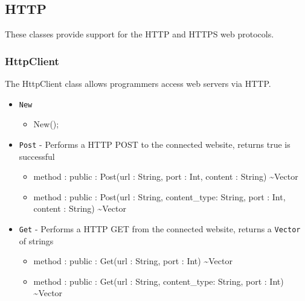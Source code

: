 \documentclass[11pt]{article}
\begin{document}
\subsection{HTTP}
These classes provide support for the HTTP and HTTPS web protocols.

\subsubsection{HttpClient}
The HttpClient class allows programmers access web servers via HTTP.
\begin{itemize}
\item \texttt{New}
  \begin{itemize}
  \item New();
  \end{itemize}
  
\item \texttt{Post} - Performs a HTTP POST to the connected website,
  returns true is successful
  \begin{itemize}
  \item method : public : Post(url : String, port : Int, content :
    String) \textasciitilde Vector
  \item method : public : Post(url : String, content\_type: String,
    port : Int, content : String) \textasciitilde Vector
  \end{itemize}

\item \texttt{Get} - Performs a HTTP GET from the connected website,
  returns a \texttt{Vector} of strings
  \begin{itemize}
  \item method : public : Get(url : String, port : Int)
    \textasciitilde Vector
  \item method : public : Get(url : String, content\_type: String,
    port : Int) \textasciitilde Vector
  \end{itemize}


\end{itemize}
\end{document}
